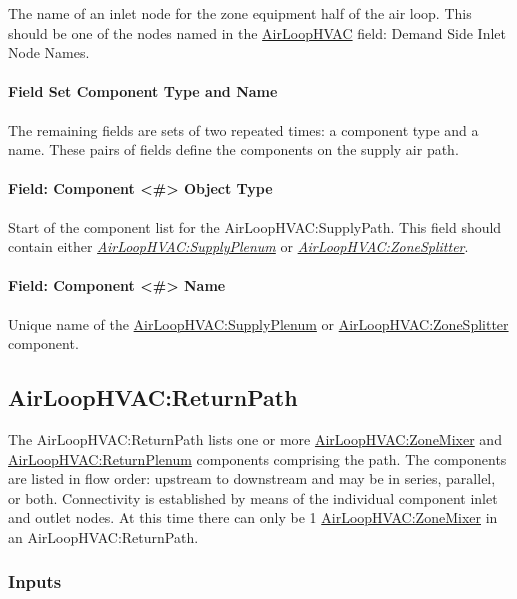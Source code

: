 The name of an inlet node for the zone equipment half of the air loop. This should be one of the nodes named in the \hyperref[airloophvac]{AirLoopHVAC} field: Demand Side Inlet Node Names.

\paragraph{Field Set Component Type and Name}\label{field-set-component-type-and-name}

The remaining fields are sets of two repeated times: a component type and a name. These pairs of fields define the components on the supply air path.

\paragraph{Field: Component \textless{}\#\textgreater{} Object Type}\label{field-component-object-type}

Start of the component list for the AirLoopHVAC:SupplyPath. This field should contain either \emph{\hyperref[airloophvacsupplyplenum]{AirLoopHVAC:SupplyPlenum}} or \emph{\hyperref[airloophvaczonesplitter]{AirLoopHVAC:ZoneSplitter}}.

\paragraph{Field: Component \textless{}\#\textgreater{} Name}\label{field-component-name}

Unique name of the \hyperref[airloophvacsupplyplenum]{AirLoopHVAC:SupplyPlenum} or \hyperref[airloophvaczonesplitter]{AirLoopHVAC:ZoneSplitter} component.

\subsection{AirLoopHVAC:ReturnPath}\label{airloophvacreturnpath}

The AirLoopHVAC:ReturnPath lists one or more \hyperref[airloophvaczonemixer]{AirLoopHVAC:ZoneMixer} and \hyperref[airloophvacreturnplenum]{AirLoopHVAC:ReturnPlenum} components comprising the path. The components are listed in flow order: upstream to downstream and may be in series, parallel, or both. Connectivity is established by means of the individual component inlet and outlet nodes. At this time there can only be 1 \hyperref[airloophvaczonemixer]{AirLoopHVAC:ZoneMixer} in an AirLoopHVAC:ReturnPath.

\subsubsection{Inputs}\label{inputs-1-003}

